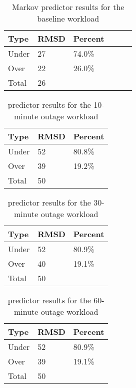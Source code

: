 \begin{table}[H]
\centering
\begin{tabular}{| l | l | l | l | l | l |}
\hline
Type & RMSD & Percent \\ \hline
Under & 27 & 74.0\% \\ \hline
Over & 22 & 26.0\% \\ \hline
Total & 26 & \\ \hline
\end{tabular}
\caption{Markov predictor results for the baseline workload}
\end{table}


\begin{table}[H]
\centering
\begin{tabular}{| l | l | l |}
\hline
Type & RMSD & Percent \\ \hline
Under & 52 & 80.8\% \\ \hline
Over & 39 & 19.2\% \\ \hline
Total & 50 & \\ \hline
\end{tabular}
\caption{predictor results for the 10-minute outage workload}
\end{table}

\begin{table}[H]
\centering
\begin{tabular}{| l | l | l |}
\hline
Type & RMSD & Percent \\ \hline
Under & 52 & 80.9\% \\ \hline
Over & 40 & 19.1\% \\ \hline
Total & 50 & \\ \hline
\end{tabular}
\caption{predictor results for the 30-minute outage workload}
\end{table}

\begin{table}[H]
\centering
\begin{tabular}{| l | l | l |}
\hline
Type & RMSD & Percent \\ \hline
Under & 52 & 80.9\% \\ \hline
Over & 39 & 19.1\% \\ \hline
Total & 50 & \\ \hline
\end{tabular}
\caption{predictor results for the 60-minute outage workload}
\end{table}


